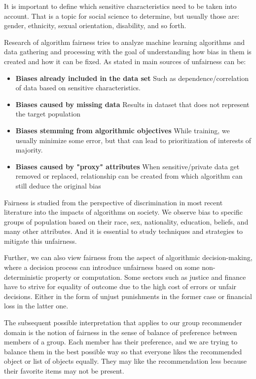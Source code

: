 It is important to define which sensitive characteristics need to be taken into account. That is a topic for social science to determine, but usually those are: gender, ethnicity, sexual orientation, disability, and so forth.

Research of algorithm fairness tries to analyze machine learning algorithms and data gathering and processing with the goal of understanding how bias in them is created and how it can be fixed.
\newline
As stated in \cite{pessach2020algorithmic_fairness} main sources of unfairness can be:
\begin{itemize}
    \item \textbf{Biases already included in the data set}
    Such as dependence/correlation of data based on sensitive characteristics.
    \item \textbf{Biases caused by missing data}
    Results in dataset that does not represent the target population
    \item \textbf{Biases stemming from algorithmic objectives}\newline
    While training, we usually minimize some error, but that can lead to prioritization of interests of majority.
    \item \textbf{Biases caused by "proxy" attributes}\newline
    When sensitive/private data get removed or replaced, relationship can be created from which algorithm can still deduce the original bias
\end{itemize}


Fairness is studied from the perspective of discrimination in most recent literature into the impacts of algorithms on society. We observe bias to specific groups of population based on their race, sex, nationality, education, beliefs, and many other attributes. And it is essential to study techniques and strategies to mitigate this unfairness.

Further, we can also view fairness from the aspect of algorithmic decision-making, where a decision process can introduce unfairness based on some non-deterministic property or computation. Some sectors such as justice and finance have to strive for equality of outcome due to the high cost of errors or unfair decisions. Either in the form of unjust punishments in the former case or financial loss in the latter one.

The subsequent possible interpretation that applies to our group recommender domain is the notion of fairness in the sense of balance of preference between members of a group. Each member has their preference, and we are trying to balance them in the best possible way so that everyone likes the recommended object or list of objects equally. They may like the recommendation less because their favorite items may not be present.

